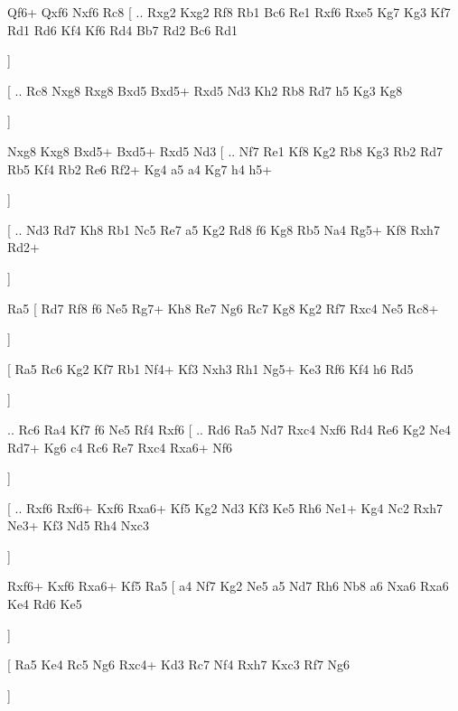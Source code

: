               Qf6+   Qxf6    Nxf6   Rc8 [ .. Rxg2  Kxg2 Rf8  Rb1 Bc6  Re1 Rxf6  Rxe5 Kg7  Kg3 Kf7  Rd1 Rd6  Kf4 Kf6  Rd4 Bb7  Rd2 Bc6  Rd1   
              
              \dummy  \showboard  ] 
              
               [ .. Rc8  Nxg8 Rxg8  Bxd5 Bxd5+  Rxd5 Nd3  Kh2 Rb8  Rd7 h5  Kg3 Kg8   
               
               \dummy  \showboard  ]  
               
               Nxg8   Kxg8    Bxd5+   Bxd5+    Rxd5   Nd3 [ .. Nf7  Re1 Kf8  Kg2 Rb8  Kg3 Rb2  Rd7 Rb5  Kf4 Rb2  Re6 Rf2+  Kg4 a5  a4 Kg7  h4 h5+   
               
               \dummy  \showboard  ]  
               
               [ .. Nd3  Rd7 Kh8  Rb1 Nc5  Re7 a5  Kg2 Rd8  f6 Kg8  Rb5 Na4  Rg5+ Kf8  Rxh7 Rd2+   
               
               \dummy  \showboard  ]  
               
               Ra5 [  Rd7 Rf8  f6 Ne5  Rg7+ Kh8  Re7 Ng6  Rc7 Kg8  Kg2 Rf7  Rxc4 Ne5  Rc8+   
               
               \dummy  \showboard  ] 
               
                [  Ra5 Rc6  Kg2 Kf7  Rb1 Nf4+  Kf3 Nxh3  Rh1 Ng5+  Ke3 Rf6  Kf4 h6  Rd5   
                
                \dummy  \showboard  ]
                
                 .. Rc6    Ra4   Kf7    f6   Ne5    Rf4   Rxf6 [ .. Rd6  Ra5 Nd7  Rxc4 Nxf6  Rd4 Re6  Kg2 Ne4  Rd7+ Kg6  c4 Rc6  Re7 Rxc4  Rxa6+ Nf6   
                 
                 \dummy  \showboard  ]  
                 
                 [ .. Rxf6  Rxf6+ Kxf6  Rxa6+ Kf5  Kg2 Nd3  Kf3 Ke5  Rh6 Ne1+  Kg4 Nc2  Rxh7 Ne3+  Kf3 Nd5  Rh4 Nxc3   
                 
                 \dummy  \showboard  ] 
                 
                  Rxf6+   Kxf6    Rxa6+   Kf5    Ra5 [  a4 Nf7  Kg2 Ne5  a5 Nd7  Rh6 Nb8  a6 Nxa6  Rxa6 Ke4  Rd6 Ke5   
                  
                  \dummy  \showboard  ] 
                  
                   [  Ra5 Ke4  Rc5 Ng6  Rxc4+ Kd3  Rc7 Nf4  Rxh7 Kxc3  Rf7 Ng6   
                   
                   \dummy  \showboard  ] 
                   
